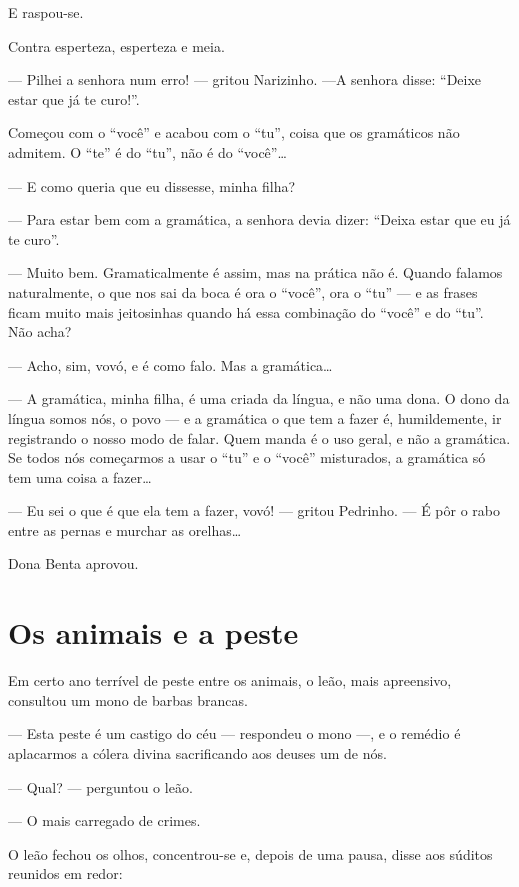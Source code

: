 E raspou-se.

Contra esperteza, esperteza e meia.

--- Pilhei a senhora num erro! --- gritou Narizinho. ---A senhora disse:
``Deixe estar que já te curo!''.

Começou com o ``você'' e acabou com o ``tu'', coisa que os gramáticos
não admitem. O ``te'' é do ``tu'', não é do ``você''\ldots{}

--- E como queria que eu dissesse, minha filha?

--- Para estar bem com a gramática, a senhora devia dizer: ``Deixa estar
que eu já te curo''.

--- Muito bem. Gramaticalmente é assim, mas na prática não é. Quando
falamos naturalmente, o que nos sai da boca é ora o ``você'', ora o
``tu'' --- e as frases ficam muito mais jeitosinhas quando há essa
combinação do ``você'' e do ``tu''. Não acha?

--- Acho, sim, vovó, e é como falo. Mas a gramática\ldots{}

--- A gramática, minha filha, é uma criada da língua, e não uma dona. O
dono da língua somos nós, o povo --- e a gramática o que tem a fazer é,
humildemente, ir registrando o nosso modo de falar. Quem manda é o uso
geral, e não a gramática. Se todos nós começarmos a usar o ``tu'' e o
``você'' misturados, a gramática só tem uma coisa a fazer\ldots{}

--- Eu sei o que é que ela tem a fazer, vovó! --- gritou Pedrinho. --- É
pôr o rabo entre as pernas e murchar as orelhas\ldots{}

Dona Benta aprovou.


\chapter{Os animais e a peste}

Em certo ano terrível de peste entre os animais, o leão, mais
apreensivo, consultou um mono de barbas brancas.

--- Esta peste é um castigo do céu --- respondeu o mono ---, e o remédio
é aplacarmos a cólera divina sacrificando aos deuses um de nós.

--- Qual? --- perguntou o leão.

--- O mais carregado de crimes.

O leão fechou os olhos, concentrou-se e, depois de uma pausa, disse aos
súditos reunidos em redor:

